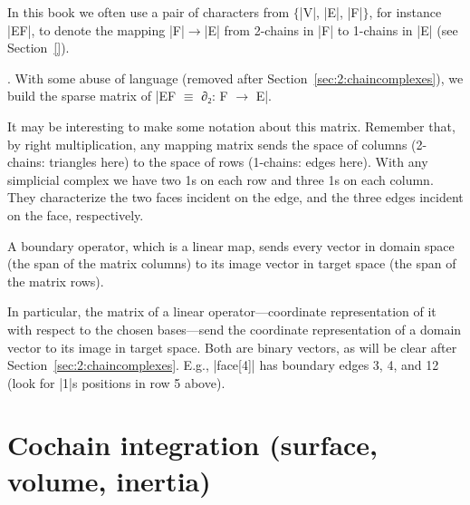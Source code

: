 In this book we often use a pair of characters from $\{$|V|, |E|, |F|$\}$, for instance |EF|, to denote the mapping |F|${}\to{}$|E| from 2-chains in |F| to 1-chains in |E| (see Section~\ref{}).



\begin{coding}.
With some abuse of language (removed after Section~\ref{sec:2:chaincomplexes}), we build the sparse matrix of |EF $\equiv$ ∂₂: F $\to$ E|. 

It may be interesting to make some notation about this matrix. Remember that, by right multiplication, any mapping matrix sends the space of columns (2-chains: triangles here) to the space of rows (1-chains: edges here). With any simplicial complex we have two 1s on each row and three 1s on each column. They characterize the two faces incident on the edge, and the three edges incident on the face, respectively.
\end{coding}


\begin{coding}
A boundary operator, which is a linear map, sends every vector in domain space (the span of the matrix columns) to its image vector in target space (the span of the matrix rows). 

In particular, the matrix of a linear operator---coordinate representation of it with respect to the chosen bases---send the coordinate representation of a domain vector to its image in target space. Both are binary vectors, as will be clear after Section~\ref{sec:2:chaincomplexes}. E.g.,  |face[4]| has boundary edges 3, 4, and 12 (look for |1|s positions in row 5 above).
\end{coding}


\section{Cochain integration (surface, volume, inertia)}\label{sect:3-4}






